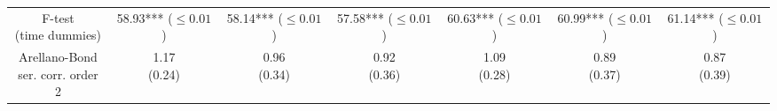 \begin{tabular}{ccccccc}
             \makecell{F-test\\(time dummies)} &   \makecell{58.93***\\($\leq 0.01$)} &   \makecell{58.14***\\($\leq 0.01$)} &   \makecell{57.58***\\($\leq 0.01$)} &   \makecell{60.63***\\($\leq 0.01$)} &   \makecell{60.99***\\($\leq 0.01$)} &   \makecell{61.14***\\($\leq 0.01$)} \\
 \makecell{Arellano-Bond\\ser. corr.  order 2} &              \makecell{1.17\\(0.24)} &              \makecell{0.96\\(0.34)} &              \makecell{0.92\\(0.36)} &              \makecell{1.09\\(0.28)} &              \makecell{0.89\\(0.37)} &              \makecell{0.87\\(0.39)} \\
\bottomrule
\end{tabular}
